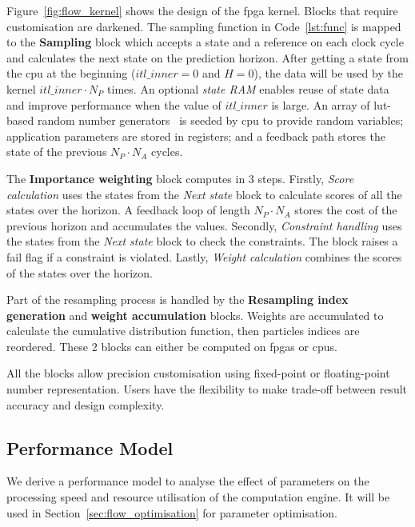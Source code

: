 Figure~\ref{fig:flow_kernel} shows the design of the \gls{fpga} kernel. Blocks that require customisation are darkened.
The sampling function in Code~\ref{lst:func} is mapped to the \textbf{Sampling} block which accepts a state and a reference on each clock cycle and calculates the next state on the prediction horizon.
After getting a state from the \gls{cpu} at the beginning ($itl\_inner=0$ and $H=0$), the data will be used by the kernel $itl\_inner \cdot N_P$ times.
An optional \textit{state RAM} enables reuse of state data and improve performance when the value of $itl\_inner$ is large.
An array of \gls{lut}-based random number generators~\cite{thomas07,thomas10} is seeded by \gls{cpu} to provide random variables; application parameters are stored in registers; and
a feedback path stores the state of the previous $N_P \cdot N_A$ cycles.

The \textbf{Importance weighting} block computes in 3 steps.
Firstly, \textit{Score calculation} uses the states from the \emph{Next state} block to calculate scores of all the states over the horizon.
A feedback loop of length $N_P \cdot N_A$ stores the cost of the previous horizon and accumulates the values.
Secondly, \textit{Constraint handling} uses the states from the \emph{Next state} block to check the constraints.
The block raises a fail flag if a constraint is violated.
Lastly, \textit{Weight calculation} combines the scores of the states over the horizon.

Part of the resampling process is handled by the \textbf{Resampling index generation} and \textbf{weight accumulation} blocks.
Weights are accumulated to calculate the cumulative distribution function, then particles indices are reordered.
These 2 blocks can either be computed on \glspl{fpga} or \glspl{cpu}.

All the blocks allow precision customisation using fixed-point or floating-point number representation.
Users have the flexibility to make trade-off between result accuracy and design complexity.


\subsection{Performance Model}
\label{sec:flow_model}

We derive a performance model to analyse the effect of parameters on the processing speed and resource utilisation of the computation engine.
It will be used in Section~\ref{sec:flow_optimisation} for parameter optimisation.

